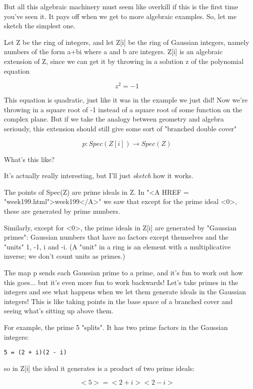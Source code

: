 But all this algebraic machinery must seem like overkill if this is the 
first time you've seen it.  It pays off when we get to more algebraic 
examples.  So, let me sketch the simplest one.

Let Z be the ring of integers, and let Z[i] be the ring of Gaussian 
integers, namely numbers of the form a+bi where a and b are integers.  
Z[i] is an algebraic extension of Z, since we can get it by throwing in 
a solution z of the polynomial equation

$$
z^{2} = -1
$$
    

This equation is quadratic, just like it was in the example we just
did!  Now we're throwing in a square root of -1 instead of a square 
root of some function on the complex plane.  But if we take the analogy 
between geometry and algebra seriously, this extension should still give
some sort of "branched double cover"

$$
p: Spec(Z[i]) \to  Spec(Z)
$$
    

What's this like?  

It's actually really interesting, but I'll just \emph{sketch} how it works.

The points of Spec(Z) are prime ideals in Z.  In "<A HREF = "week199.html">week199</A>" we saw 
that except for the prime ideal <0>, these are generated by prime 
numbers.
  
Similarly, except for <0>, the prime ideals in Z[i] are generated by 
"Gaussian primes": Gaussian numbers that have no factors except 
themselves and the "units" 1, -1, i and -i.  (A "unit" 
in a ring is an 
element with a multiplicative inverse; we don't count units as primes.)

The map p sends each Gaussian prime to a prime, and it's fun to work
out how this goes... but it's even more fun to work backwards!  Let's
take primes in the integers and see what happens when we let them 
generate ideals in the Gaussian integers!  This is like taking points 
in the base space of a branched cover and seeing what's sitting up  
above them.    

For example, the prime 5 "splits".  It has two prime factors in the
Gaussian integers:

\begin{verbatim}
5 = (2 + i)(2 - i)
\end{verbatim}
    
so in Z[i] the ideal it generates is a product of two prime ideals:

$$
<5> = <2 + i> <2 - i>
$$
    


